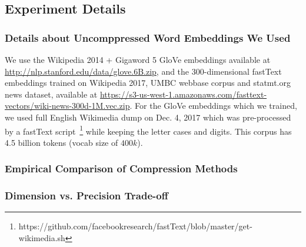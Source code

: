 \subsection{Experiment Details}
\label{app:experiment_details}



\subsubsection{Details about Uncomppressed Word Embeddings We Used}
We use the Wikipedia 2014 + Gigaword 5 GloVe embeddings available at \url{http://nlp.stanford.edu/data/glove.6B.zip}, and the 300-dimensional fastText embeddings trained on Wikipedia 2017, UMBC webbase corpus and statmt.org news dataset, available at \url{https://s3-us-west-1.amazonaws.com/fasttext-vectors/wiki-news-300d-1M.vec.zip}.
For the GloVe embeddings which we trained, we used full English Wikimedia dump on Dec. 4, 2017 which was pre-processed by a fastText script~\footnote{https://github.com/facebookresearch/fastText/blob/master/get-wikimedia.sh} while keeping the letter cases and digits.
This corpus has 4.5 billion tokens (vocab size of $400k$).


\subsubsection{Empirical Comparison of Compression Methods}

\subsubsection{Dimension vs. Precision Trade-off}

